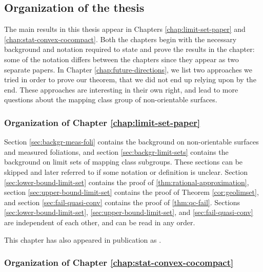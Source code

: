 
\subsection*{Organization of the thesis}

The main results in this thesis appear in Chapters \ref{chap:limit-set-paper} and \ref{chap:stat-convex-cocompact}.
Both the chapters begin with the necessary background and notation required to state and prove the results in the chapter: some of the notation differs between the chapters since they appear as two separate papers.
In Chapter \ref{chap:future-directions}, we list two approaches we tried in order to prove our theorem, that we did not end up relying upon by the end.
These approaches are interesting in their own right, and lead to more questions about the mapping class group of non-orientable surfaces.

\subsubsection*{Organization of Chapter \ref{chap:limit-set-paper}}

Section \ref{sec:backgr-meas-foli} contains the background on non-orientable surfaces and measured foliations, and section \ref{sec:backgr-limit-sets} contains the background on limit sets of mapping class subgroups.
These sections can be skipped and later referred to if some notation or definition is unclear.
Section \ref{sec:lower-bound-limit-set} contains the proof of \autoref{thm:rational-approximation}, section \ref{sec:upper-bound-limit-set} contains the proof of Theorem \ref{cor:geolimset}, and section \ref{sec:fail-quasi-conv} contains the proof of \autoref{thm:qc-fail}.
Sections \ref{sec:lower-bound-limit-set}, \ref{sec:upper-bound-limit-set}, and \ref{sec:fail-quasi-conv} are independent of each other, and can be read in any order.

This chapter has also appeared in publication as \cite{limitsetkhan}.

\subsubsection*{Organization of Chapter \ref{chap:stat-convex-cocompact}}

